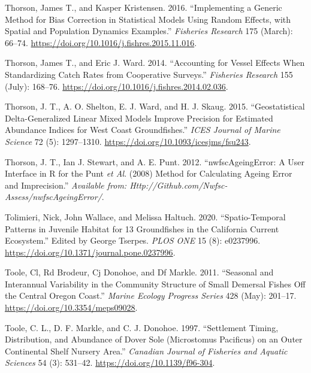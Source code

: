 \documentclass[11pt,
  english,
  a4paper,
]{article}
\begin{document}
\begin{cslreferences}
\leavevmode\hypertarget{ref-thorson_implementing_2016}{}%
Thorson, James T., and Kasper Kristensen. 2016. ``Implementing a Generic Method for Bias Correction in Statistical Models Using Random Effects, with Spatial and Population Dynamics Examples.'' \emph{Fisheries Research} 175 (March): 66--74. \url{https://doi.org/10.1016/j.fishres.2015.11.016}.

\leavevmode\hypertarget{ref-thorson_accounting_2014}{}%
Thorson, James T., and Eric J. Ward. 2014. ``Accounting for Vessel Effects When Standardizing Catch Rates from Cooperative Surveys.'' \emph{Fisheries Research} 155 (July): 168--76. \url{https://doi.org/10.1016/j.fishres.2014.02.036}.

\leavevmode\hypertarget{ref-thorson_geostatistical_2015}{}%
Thorson, J. T., A. O. Shelton, E. J. Ward, and H. J. Skaug. 2015. ``Geostatistical Delta-Generalized Linear Mixed Models Improve Precision for Estimated Abundance Indices for West Coast Groundfishes.'' \emph{ICES Journal of Marine Science} 72 (5): 1297--1310. \url{https://doi.org/10.1093/icesjms/fsu243}.

\leavevmode\hypertarget{ref-thorson_nwfscageingerror:_2012}{}%
Thorson, J. T., Ian J. Stewart, and A. E. Punt. 2012. ``nwfscAgeingError: A User Interface in R for the Punt \emph{et Al}. (2008) Method for Calculating Ageing Error and Imprecision.'' \emph{Available from: Http://Github.com/Nwfsc-Assess/nwfscAgeingError/}.

\leavevmode\hypertarget{ref-tolimieri_spatio-temporal_2020}{}%
Tolimieri, Nick, John Wallace, and Melissa Haltuch. 2020. ``Spatio-Temporal Patterns in Juvenile Habitat for 13 Groundfishes in the California Current Ecosystem.'' Edited by George Tserpes. \emph{PLOS ONE} 15 (8): e0237996. \url{https://doi.org/10.1371/journal.pone.0237996}.

\leavevmode\hypertarget{ref-toole_seasonal_2011}{}%
Toole, Cl, Rd Brodeur, Cj Donohoe, and Df Markle. 2011. ``Seasonal and Interannual Variability in the Community Structure of Small Demersal Fishes Off the Central Oregon Coast.'' \emph{Marine Ecology Progress Series} 428 (May): 201--17. \url{https://doi.org/10.3354/meps09028}.

\leavevmode\hypertarget{ref-toole_settlement_1997}{}%
Toole, C. L., D. F. Markle, and C. J. Donohoe. 1997. ``Settlement Timing, Distribution, and Abundance of Dover Sole (Microstomus Pacificus) on an Outer Continental Shelf Nursery Area.'' \emph{Canadian Journal of Fisheries and Aquatic Sciences} 54 (3): 531--42. \url{https://doi.org/10.1139/f96-304}.


\end{cslreferences}
\end{document}
